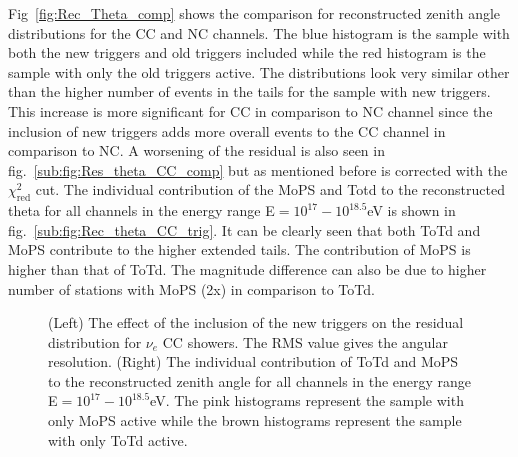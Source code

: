  Fig~\ref{fig:Rec_Theta_comp} shows the comparison for reconstructed zenith angle distributions for the CC and NC channels. The blue histogram is the sample with both the new triggers and old triggers included while the red histogram is the sample with only the old triggers active. The distributions look very similar other than the higher number of events in the tails for the sample with new triggers. This increase is more significant for CC in comparison to NC channel since the inclusion of new triggers adds more overall events to the CC channel in comparison to NC. A worsening of the residual is also seen in fig.~\ref{sub:fig:Res_theta_CC_comp} but as mentioned before is corrected with the $\chi^2_{\text{red}}$ cut. 
 The individual contribution of the MoPS and Totd to the reconstructed theta for all channels in the energy range E$=10^{17}-10^{18.5}$eV is shown in fig.~\ref{sub:fig:Rec_theta_CC_trig}. It can be clearly seen that both ToTd and MoPS contribute to the higher extended tails. The contribution of MoPS is higher than that of ToTd. The magnitude difference can also be due to higher number of stations with MoPS (2x) in comparison to ToTd.
 
\begin{figure}[h!]
  \centering
  \hfill
  \caption{(Left) The effect of the inclusion of the new triggers on the residual distribution for $\nu_e$ CC showers. The RMS value gives the angular resolution. (Right) The individual contribution of ToTd and MoPS to the reconstructed zenith angle for all channels in the energy range E$=10^{17}-10^{18.5}$eV. The pink histograms represent the sample with only MoPS active while the brown histograms represent the sample with only ToTd active.}
  \label{fig:Res_Theta}
\end{figure}

